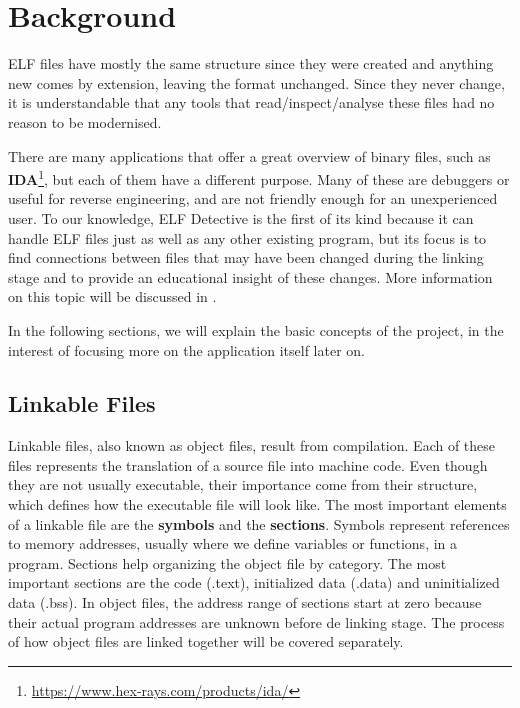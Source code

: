 
\chapter{Background}
\label{chapter:bkg}

ELF files have mostly the same structure since they were created and anything new comes by extension, leaving the format unchanged. Since they never change, it is understandable that any tools that read/inspect/analyse these files had no reason to be modernised.

There are many applications that offer a great overview of binary files, such as \textbf{IDA}\footnote{\url{https://www.hex-rays.com/products/ida/}}, but each of them have a different purpose. Many of these are debuggers or useful for reverse engineering, and are not friendly enough for an unexperienced user. To our knowledge, ELF Detective is the first of its kind because it can handle ELF files just as well as any other existing program, but its focus is to find connections between files that may have been changed during the linking stage and to provide an educational insight of these changes. More information on this topic will be discussed in .

In the following sections, we will explain the basic concepts of the project, in the interest of focusing more on the application itself later on.

\section{Linkable Files}
\label{sec:l-files}

Linkable files, also known as object files, result from compilation. Each of these files represents the translation of a source file into machine code. Even though they are not usually executable, their importance come from their structure, which defines how the executable file will look like. The most important elements of a linkable file are the \textbf{symbols} and the \textbf{sections}. Symbols represent references to memory addresses, usually where we define variables or functions, in a program. Sections help organizing the object file by category. The most important sections are the code (.text), initialized data (.data) and uninitialized data (.bss). In object files, the address range of sections start at zero because their actual program addresses are unknown before de linking stage. The process of how object files are linked together will be covered separately. 


